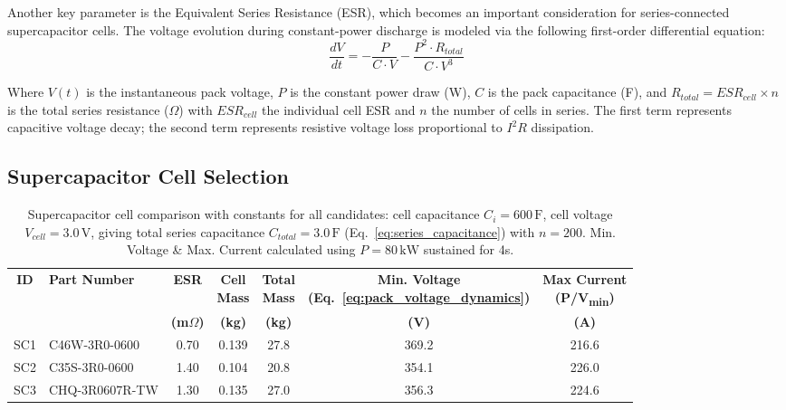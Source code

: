 Another key parameter is the Equivalent Series Resistance (ESR), which becomes an important consideration for series-connected supercapacitor cells. The voltage evolution during constant-power discharge is modeled via the following first-order differential equation:
\begin{equation}
\frac{dV}{dt} = -\frac{P}{C \cdot V} - \frac{P^2 \cdot R_{total}}{C \cdot V^3}
\label{eq:pack_voltage_dynamics}
\end{equation}

Where $V(t)$ is the instantaneous pack voltage, $P$ is the constant power draw (W), $C$ is the pack capacitance (F), and $R_{total} = ESR_{cell} \times n$ is the total series resistance (\(\Omega\)) with $ESR_{cell}$ the individual cell ESR and $n$ the number of cells in series. The first term represents capacitive voltage decay; the second term represents resistive voltage loss proportional to $I^2 R$ dissipation.

\subsection{Supercapacitor Cell Selection}
\begin{table}[htbp]
    \centering
    \caption{Supercapacitor cell comparison with constants for all candidates: cell capacitance $C_i=600\,\text{F}$, cell voltage $V_{cell}=3.0\,\text{V}$, giving total series capacitance $C_{total}=3.0\,\text{F}$ (Eq.~\ref{eq:series_capacitance}) with $n=200$. Min. Voltage \& Max. Current calculated using $P=80\,\text{kW}$ sustained for 4s.}
    \label{tab:supercap_cells}
    \begin{tabular}{|c|l|c|c|c|c|c|}
        \hline
        \textbf{ID} & \textbf{Part Number} & \textbf{ESR} & \makecell{\textbf{Cell} \\ \textbf{Mass}} & \makecell{\textbf{Total} \\ \textbf{Mass}} & \makecell{\textbf{Min. Voltage} \\ \textbf{(Eq.~\ref{eq:pack_voltage_dynamics})}} & \makecell{\textbf{Max Current} \\ \textbf{(P/V\textsubscript{min})}} \\
        & & \textbf{(m$\Omega$)} & \textbf{(kg)} & \textbf{(kg)} & \textbf{(V)} & \textbf{(A)} \\
        \hline
        SC1 & C46W-3R0-0600 \cite{sech-c46w-3r0-0600} & 0.70 & 0.139 & 27.8 & 369.2 & 216.6 \\
        SC2 & C35S-3R0-0600 \cite{gmcc-c35s-3r0-0600} & 1.40 & 0.104 & 20.8 & 354.1 & 226.0 \\
        SC3 & CHQ-3R0607R-TW \cite{cda-chq-3r0607r-tw} & 1.30 & 0.135 & 27.0 & 356.3 & 224.6 \\
        \hline
    \end{tabular}
\end{table}

